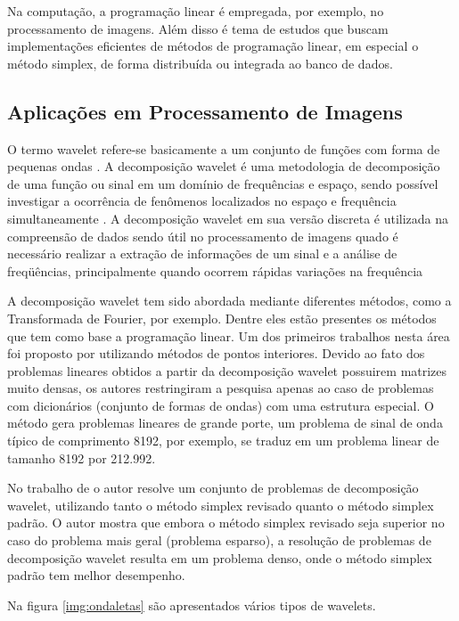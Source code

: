 Na computação, a programação linear é empregada, por exemplo, no processamento de imagens. Além disso é tema de estudos que buscam implementações eficientes de métodos de programação linear, em especial o método simplex, de forma distribuída ou integrada ao banco de dados.

\subsection{Aplicações em Processamento de Imagens}
O termo wavelet refere-se basicamente a um conjunto de funções com forma de pequenas ondas \cite{Ondaletas}. A decomposição wavelet é uma metodologia de decomposição de uma função ou sinal em um domínio de frequências e espaço, sendo possível investigar a ocorrência de fenômenos localizados no espaço e frequência simultaneamente \cite{Peixoto-wavelet}.
A decomposição wavelet em sua versão discreta é utilizada na compreensão de dados sendo útil no processamento de imagens quado é necessário realizar a extração de informações de um sinal e a análise de freqüências, principalmente quando ocorrem rápidas variações na frequência \cite{Leite-wavelet}

A decomposição wavelet tem sido abordada mediante diferentes métodos, como a Transformada de Fourier, por exemplo. Dentre eles estão presentes os métodos que tem como base a programação linear. Um dos primeiros trabalhos nesta área foi proposto por  utilizando métodos de pontos interiores. Devido ao fato dos problemas lineares obtidos a partir da decomposição wavelet possuirem matrizes muito densas, os autores restringiram a pesquisa apenas ao caso de problemas com dicionários (conjunto de formas de ondas) com uma estrutura especial.  O método gera problemas lineares de grande porte, um problema de sinal de onda típico de comprimento 8192, por exemplo, se traduz em um problema linear de tamanho 8192 por 212.992.

No trabalho de  o autor resolve um conjunto de problemas de decomposição wavelet, utilizando tanto o método simplex revisado quanto o método simplex padrão. O autor mostra que embora o método simplex revisado seja superior no caso do problema mais geral (problema esparso), a resolução de problemas de decomposição wavelet resulta em um problema denso, onde o método simplex padrão tem melhor  desempenho.

Na figura \ref{img:ondaletas} são apresentados vários tipos de wavelets.

